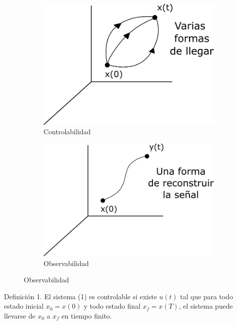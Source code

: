 \begin{figure}[h!]
    \centering
    \begin{subfigure}[b]{0.45\linewidth}
        \includegraphics[scale=0.25]{Control de Sistemas Mecatronicos Figuras/01 Controlabilidad}
        \caption{Controlabilidad}
    \end{subfigure}
    \begin{subfigure}[b]{0.45\linewidth}
        \includegraphics[scale=0.25]{Control de Sistemas Mecatronicos Figuras/02 Observabilidad}
        \caption{Observabilidad}
    \end{subfigure}
\end{figure}

Definición 1. El sistema (1) es controlable si existe \(u(t)\) tal que para todo estado inicial \( x_{0}=x(0) \) y todo estado final \(x_{f}=x(T)\), el sistema puede llevarse de \( x_{0} \) a \( x_{f} \) en tiempo finito.